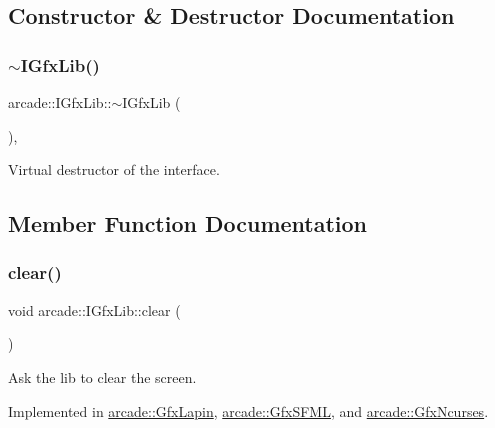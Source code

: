 \subsection{Constructor \& Destructor Documentation}
\mbox{\label{classarcade_1_1_i_gfx_lib_a1dc0971c862d69be60af1d3b82960c77}} 
\subsubsection{\texorpdfstring{$\sim$\+I\+Gfx\+Lib()}{~IGfxLib()}}
{\footnotesize\ttfamily arcade\+::\+I\+Gfx\+Lib\+::$\sim$\+I\+Gfx\+Lib (\begin{DoxyParamCaption}{ }\end{DoxyParamCaption})\hspace{0.3cm}{\ttfamily [inline]}, {\ttfamily [virtual]}}



Virtual destructor of the interface. 



\subsection{Member Function Documentation}
\mbox{\label{classarcade_1_1_i_gfx_lib_a4116b3d4f503c4a795539b584f77a73d}} 
\subsubsection{\texorpdfstring{clear()}{clear()}}
{\footnotesize\ttfamily void arcade\+::\+I\+Gfx\+Lib\+::clear (\begin{DoxyParamCaption}{ }\end{DoxyParamCaption})\hspace{0.3cm}{\ttfamily [pure virtual]}}



Ask the lib to clear the screen. 



Implemented in \hyperlink{classarcade_1_1_gfx_lapin_a42dd719cbf1cd88c3abf70d16f02fd92}{arcade\+::\+Gfx\+Lapin}, \hyperlink{classarcade_1_1_gfx_s_f_m_l_a12711203981dc2b9ce60df96d0aa6f55}{arcade\+::\+Gfx\+S\+F\+ML}, and \hyperlink{classarcade_1_1_gfx_ncurses_aaf443541674ace2e915e393156adf232}{arcade\+::\+Gfx\+Ncurses}.

